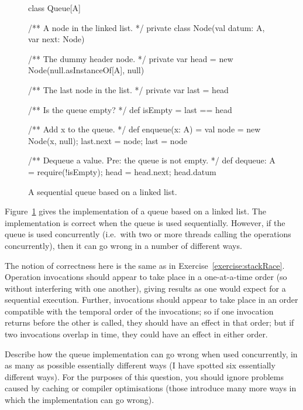 \begin{question}
\begin{figure}
\begin{scala}
class Queue[A]{
  /** A node in the linked list. */
  private class Node(val datum: A, var next: Node)

  /** The dummy header node. */
  private var head = new Node(null.asInstanceOf[A], null)

  /** The last node in the list. */
  private var last = head

  /** Is the queue empty? */
  def isEmpty = last == head

  /** Add x to the queue. */
  def enqueue(x: A) = {
    val node = new Node(x, null); last.next = node; last = node
  }

  /** Dequeue a value.  Pre: the queue is not empty. */
  def dequeue: A = {
    require(!isEmpty); head = head.next; head.datum
  }
}
\end{scala}
\caption{A sequential queue based on a linked list.}
\label{fig:queue}
\end{figure}

Figure~\ref{fig:queue} gives the implementation of a queue based on a linked
list.  The implementation is correct when the queue is used sequentially.
However, if the queue is used concurrently (i.e.~with two or more threads
calling the operations concurrently), then it can go wrong in a number of
different ways.  

The notion of correctness here is the same as in
Exercise~\ref{exercise:stackRace}.  Operation invocations should appear to
take place in a one-at-a-time order (so without interfering with one another),
giving results as one would expect for a sequential execution.  Further,
invocations should appear to take place in an order compatible with the
temporal order of the invocations; so if one invocation returns before the
other is called, they should have an effect in that order; but if two
invocations overlap in time, they could have an effect in either order.


%
Describe how the queue implementation can go wrong when used concurrently, in
as many as possible essentially different ways (I have spotted six essentially
different ways).
%
For the purposes of this question, you should ignore problems caused by
caching or compiler optimisations (those introduce many more ways in which the
implementation can go wrong).
\end{question}

